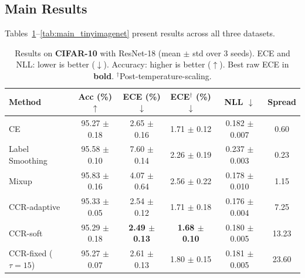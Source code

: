 \documentclass{article}
\begin{document}
\subsection{Main Results}

Tables~\ref{tab:main_cifar10}--\ref{tab:main_tinyimagenet} present results across all three datasets.

\begin{table}[t]
\caption{Results on \textbf{CIFAR-10} with ResNet-18 (mean $\pm$ std over 3 seeds). ECE and NLL: lower is better ($\downarrow$). Accuracy: higher is better ($\uparrow$). Best raw ECE in \textbf{bold}. $^\dagger$Post-temperature-scaling.}
\label{tab:main_cifar10}
\centering
\small
\begin{tabular}{lccccc}
\toprule
Method & Acc (\%) $\uparrow$ & ECE (\%) $\downarrow$ & ECE$^\dagger$ (\%) $\downarrow$ & NLL $\downarrow$ & Spread \\
\midrule
CE & 95.27 $\pm$ 0.18 & 2.65 $\pm$ 0.16 & 1.71 $\pm$ 0.12 & 0.182 $\pm$ 0.007 & 0.60 \\
Label Smoothing & 95.58 $\pm$ 0.10 & 7.60 $\pm$ 0.14 & 2.26 $\pm$ 0.19 & 0.237 $\pm$ 0.003 & 0.23 \\
Mixup & 95.83 $\pm$ 0.16 & 4.07 $\pm$ 0.64 & 2.56 $\pm$ 0.22 & 0.178 $\pm$ 0.010 & 1.15 \\
\midrule
CCR-adaptive & 95.33 $\pm$ 0.05 & 2.54 $\pm$ 0.12 & 1.71 $\pm$ 0.18 & 0.176 $\pm$ 0.004 & 7.25 \\
CCR-soft & 95.29 $\pm$ 0.18 & \textbf{2.49 $\pm$ 0.13} & \textbf{1.68 $\pm$ 0.10} & 0.180 $\pm$ 0.005 & 13.23 \\
CCR-fixed ($\tau\!=\!15$) & 95.27 $\pm$ 0.07 & 2.61 $\pm$ 0.13 & 1.80 $\pm$ 0.15 & 0.181 $\pm$ 0.005 & 23.60 \\
\bottomrule
\end{tabular}
\end{table}
\end{document}
